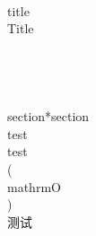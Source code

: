 \documentclass{article}%
\begin{document}
%
\normalsize%
\\title{\\Title\\}\\\\\\\\section*{section}\\test\\test \\(\\mathrm{O}\\) \\测试%
\end{document}
